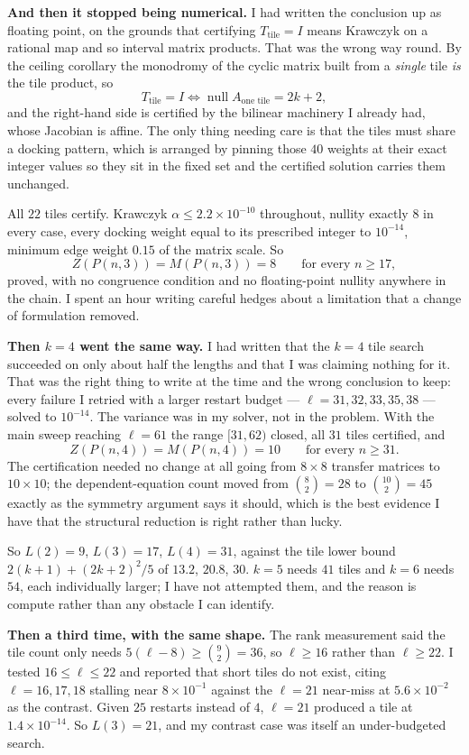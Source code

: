 \documentclass[12pt]{article}
\begin{document}
\textbf{And then it stopped being numerical.} I had written the conclusion up as
floating point, on the grounds that certifying $T_{\text{tile}}=I$ means Krawczyk
on a rational map and so interval matrix products. That was the wrong way round.
By the ceiling corollary the monodromy of the cyclic matrix built from a
\emph{single} tile \emph{is} the tile product, so
\[
  T_{\text{tile}}=I \iff \operatorname{null}A_{\text{one tile}}=2k+2,
\]
and the right-hand side is certified by the bilinear machinery I already had,
whose Jacobian is affine. The only thing needing care is that the tiles must
share a docking pattern, which is arranged by pinning those $40$ weights at
their exact integer values so they sit in the fixed set and the certified
solution carries them unchanged.

All $22$ tiles certify. Krawczyk $\alpha\le2.2\times10^{-10}$ throughout,
nullity exactly $8$ in every case, every docking weight equal to its prescribed
integer to $10^{-14}$, minimum edge weight $0.15$ of the matrix scale. So
\[
  Z(P(n,3))=M(P(n,3))=8\qquad\text{for every }n\ge17,
\]
proved, with no congruence condition and no floating-point nullity anywhere in
the chain. I spent an hour writing careful hedges about a limitation that a
change of formulation removed.

\textbf{Then $k=4$ went the same way.} I had written that the $k=4$ tile search
succeeded on only about half the lengths and that I was claiming nothing for it.
That was the right thing to write at the time and the wrong conclusion to keep:
every failure I retried with a larger restart budget --- $\ell=31,32,33,35,38$ ---
solved to $10^{-14}$. The variance was in my solver, not in the problem. With the
main sweep reaching $\ell=61$ the range $[31,62)$ closed, all $31$ tiles
certified, and
\[
  Z(P(n,4))=M(P(n,4))=10\qquad\text{for every }n\ge31 .
\]
The certification needed no change at all going from $8\times8$ transfer matrices
to $10\times10$; the dependent-equation count moved from $\binom82=28$ to
$\binom{10}2=45$ exactly as the symmetry argument says it should, which is the
best evidence I have that the structural reduction is right rather than lucky.

So $L(2)=9$, $L(3)=17$, $L(4)=31$, against the tile lower bound
$2(k+1)+(2k+2)^2/5$ of $13.2$, $20.8$, $30$. $k=5$ needs $41$ tiles and $k=6$
needs $54$, each individually larger; I have not attempted them, and the reason
is compute rather than any obstacle I can identify.

\textbf{Then a third time, with the same shape.} The rank measurement said the
tile count only needs $5(\ell-8)\ge\binom92=36$, so $\ell\ge16$ rather than
$\ell\ge22$. I tested $16\le\ell\le22$ and reported that short tiles do not
exist, citing $\ell=16,17,18$ stalling near $8\times10^{-1}$ against the
$\ell=21$ near-miss at $5.6\times10^{-2}$ as the contrast. Given $25$ restarts
instead of $4$, $\ell=21$ produced a tile at $1.4\times10^{-14}$. So $L(3)=21$,
and my contrast case was itself an under-budgeted search.
\end{document}
